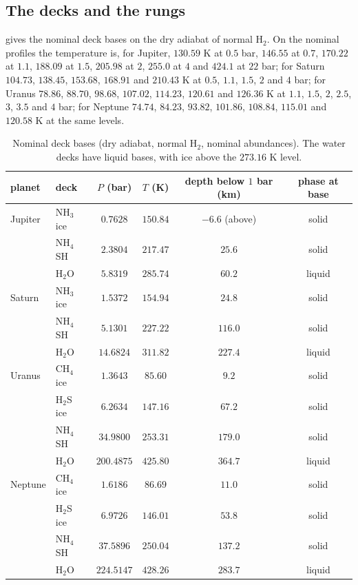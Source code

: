 \documentclass[11pt]{article}
\theoremstyle{definition}\newtheorem{definition}[theorem]{Definition}
\theoremstyle{remark}\newtheorem{remark}[theorem]{Remark}
\begin{document}
\subsection{The decks and the rungs}\label{sec:decks}
 gives the nominal deck bases on the dry adiabat of normal H$_2$. On the nominal profiles the temperature is, for Jupiter, $130.59$ K at $0.5$ bar, $146.55$ at $0.7$, $170.22$ at $1.1$, $188.09$ at $1.5$, $205.98$ at $2$, $255.0$ at $4$ and $424.1$ at $22$ bar; for Saturn $104.73$, $138.45$, $153.68$, $168.91$ and $210.43$ K at $0.5$, $1.1$, $1.5$, $2$ and $4$ bar; for Uranus $78.86$, $88.70$, $98.68$, $107.02$, $114.23$, $120.61$ and $126.36$ K at $1.1$, $1.5$, $2$, $2.5$, $3$, $3.5$ and $4$ bar; for Neptune $74.74$, $84.23$, $93.82$, $101.86$, $108.84$, $115.01$ and $120.58$ K at the same levels.

\begin{table}[!htb]\centering\small
\begin{tabular}{@{}llcccc@{}}\toprule
planet & deck & $P$ (bar) & $T$ (K) & depth below $1$ bar (km) & phase at base\\\midrule
Jupiter & NH$_3$ ice & $0.7628$ & $150.84$ & $-6.6$ (above) & solid\\
 & NH$_4$SH & $2.3804$ & $217.47$ & $25.6$ & solid\\
 & H$_2$O & $5.8319$ & $285.74$ & $60.2$ & liquid\\
Saturn & NH$_3$ ice & $1.5372$ & $154.94$ & $24.8$ & solid\\
 & NH$_4$SH & $5.1301$ & $227.22$ & $116.0$ & solid\\
 & H$_2$O & $14.6824$ & $311.82$ & $227.4$ & liquid\\
Uranus & CH$_4$ ice & $1.3643$ & $85.60$ & $9.2$ & solid\\
 & H$_2$S ice & $6.2634$ & $147.16$ & $67.2$ & solid\\
 & NH$_4$SH & $34.9800$ & $253.31$ & $179.0$ & solid\\
 & H$_2$O & $200.4875$ & $425.80$ & $364.7$ & liquid\\
Neptune & CH$_4$ ice & $1.6186$ & $86.69$ & $11.0$ & solid\\
 & H$_2$S ice & $6.9726$ & $146.01$ & $53.8$ & solid\\
 & NH$_4$SH & $37.5896$ & $250.04$ & $137.2$ & solid\\
 & H$_2$O & $224.5147$ & $428.26$ & $283.7$ & liquid\\\bottomrule
\end{tabular}
\caption{Nominal deck bases (dry adiabat, normal H$_2$, nominal abundances). The water decks have liquid bases, with ice above the $273.16$ K level.}\label{tab:decks}
\end{table}
\end{document}
